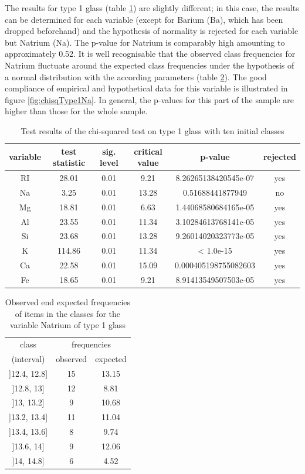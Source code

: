 \documentclass[a4paper, 12pt, titlepage, headsepline, listof = totoc, bibliography = totoc, numbers = noenddot]{scrartcl}
\begin{document}
The results for type 1 glass (table \ref{tab:chi-type1}) are slightly different; in this case, the results can be determined for each variable (except for Barium (Ba), which has been dropped beforehand) and the hypothesis of normality is rejected for each variable but Natrium (Na). The p-value for Natrium is comparably high amounting to approximately 0.52. It is well recognisable that the observed class frequencies for Natrium fluctuate around the expected class frequencies under the hypothesis of a normal distribution with the according parameters (table \ref{tab:testresChisqFreqNaType1}). The good compliance of empirical and hypothetical data for this variable is illustrated in figure \ref{fig:chisqType1Na}. In general, the p-values for this part of the sample are higher than those for the whole sample.

\begin{table}[h!]
\centering
\begin{tabular}{|cccccc|} \hline variable & test statistic & sig. level & critical value & p-value & rejected\\ \hline RI & 28.01 & 0.01 & 9.21 & 8.26265138420545e-07 & yes\\ 
Na & 3.25 & 0.01 & 13.28 & 0.51688441877949 & no\\ 
Mg & 18.81 & 0.01 & 6.63 & 1.44068580684165e-05 & yes\\ 
Al & 23.55 & 0.01 & 11.34 & 3.10284613768141e-05 & yes\\ 
Si & 23.68 & 0.01 & 13.28 & 9.26014020323773e-05 & yes\\ 
K & 114.86 & 0.01 & 11.34 & < 1.0e-15 & yes\\ 
Ca & 22.58 & 0.01 & 15.09 & 0.000405198755082603 & yes\\ 
Fe & 18.65 & 0.01 & 9.21 & 8.91413549507503e-05 & yes\\ \hline \end{tabular}\caption{Test results of the chi-squared test on type 1 glass with ten initial classes}
\label{tab:chi-type1}
\end{table}

\begin{table}[h!]
\centering
\begin{tabular}{|c|cc|} \hline class & \multicolumn{2}{c|}{frequencies}\\ (interval) & observed & expected\\ \hline ]12.4, 12.8] & 15 & 13.15\\ 
]12.8, 13] & 12 & 8.81\\ 
]13, 13.2] & 9 & 10.68\\ 
]13.2, 13.4] & 11 & 11.04\\ 
]13.4, 13.6] & 8 & 9.74\\ 
]13.6, 14] & 9 & 12.06\\ 
]14, 14.8] & 6 & 4.52\\ \hline \end{tabular}\caption{Observed end expected frequencies of items in the classes for the variable Natrium of type 1 glass}
\label{tab:testresChisqFreqNaType1}
\end{table}
\end{document}
